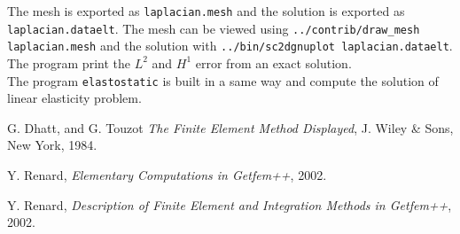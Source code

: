 \documentclass[11pt,a4paper]{article}
\begin{document}
The mesh is exported as {\tt laplacian.mesh} and the solution is exported as {\tt laplacian.dataelt}. The mesh can be viewed using {\tt ../contrib/draw\_mesh laplacian.mesh} and the solution with {\tt ../bin/sc2dgnuplot laplacian.dataelt}. The program print the $L^2$ and $H^1$ error from an exact solution.\\[0.5cm]
The program {\tt elastostatic} is built in a same way and compute the solution of linear elasticity problem.

\begin{thebibliography}{99}
% 
% 
% 
  G. {\sc Dhatt, and  G. Touzot}
  {\it The Finite Element Method Displayed}, 
 J. Wiley \& Sons,  New York, 1984.

  Y. {\sc Renard},
  {\it Elementary Computations in {\sc Getfem++}}, 2002.

  Y. {\sc Renard},
  {\it Description of Finite Element and Integration Methods in {\sc Getfem++}}, 2002.

\end{thebibliography}
\end{document}
